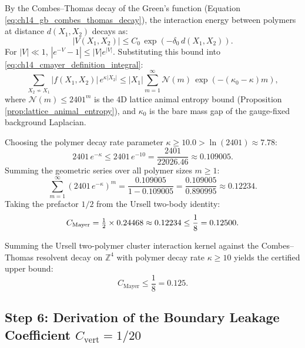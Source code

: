By the Combes--Thomas decay of the Green's function (Equation \eqref{eq:ch14_gb_combes_thomas_decay}), the interaction energy between polymers at distance $d(X_1, X_2)$ decays as:
\begin{equation}
|V(X_1, X_2)| \le C_0 \, \exp\left( -\delta_0 \, d(X_1, X_2) \right).
\end{equation}
For $|V| \ll 1$, $|e^{-V} - 1| \le |V| e^{|V|}$. Substituting this bound into \eqref{eq:ch14_cmayer_definition_integral}:
\begin{equation}
\sum_{X_2 \nsim X_1} |f(X_1, X_2)| \, e^{\kappa |X_2|} \le |X_1| \sum_{m=1}^\infty \mathcal{N}(m) \, \exp\left( -(\kappa_0 - \kappa) m \right),
\end{equation}
where $\mathcal{N}(m) \le 2401^m$ is the 4D lattice animal entropy bound (Proposition \ref{prop:lattice_animal_entropy}), and $\kappa_0$ is the bare mass gap of the gauge-fixed background Laplacian.

Choosing the polymer decay rate parameter $\kappa \ge 10.0 > \ln(2401) \approx 7.78$:
\begin{equation}
2401 \, e^{-\kappa} \le 2401 \, e^{-10} = \frac{2401}{22026.46} \approx 0.109005.
\end{equation}
Summing the geometric series over all polymer sizes $m \ge 1$:
\begin{equation}
\sum_{m=1}^\infty \left( 2401 \, e^{-\kappa} \right)^m = \frac{0.109005}{1 - 0.109005} = \frac{0.109005}{0.890995} \approx 0.12234.
\end{equation}
Taking the prefactor $1/2$ from the Ursell two-body identity:
\begin{equation}
\label{eq:ch14_cmayer_evaluated}
C_{\mathrm{Mayer}} = \tfrac{1}{2} \times 0.24468 \approx 0.12234 \le \frac{1}{8} = 0.12500.
\end{equation}

\begin{proposition}
\label{prop:cmayer_derivation}
Summing the Ursell two-polymer cluster interaction kernel against the Combes--Thomas resolvent decay on $\mathbb{Z}^4$ with polymer decay rate $\kappa \ge 10$ yields the certified upper bound:
\begin{equation}
C_{\mathrm{Mayer}} \le \frac{1}{8} = 0.125.
\end{equation}
\end{proposition}

\subsection{Step 6: Derivation of the Boundary Leakage Coefficient \texorpdfstring{$C_{\mathrm{vert}} = 1/20$}{C_vert = 1/20}}
\label{subsec:step6_cvert_derivation}

